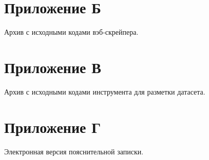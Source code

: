 \documentclass[../main]{subfiles}
\begin{document}
\newpage
{}
\label{sec:appendix2}
\section*{Приложение Б}

Архив с исходными кодами вэб-скрейпера.


\newpage
{}
\label{sec:appendix3}
\section*{Приложение В}

Архив с исходными кодами инструмента для разметки датасета.



\newpage
{}
\label{sec:appendix4}
\section*{Приложение Г}

Электронная версия пояснительной записки.
\end{document}
